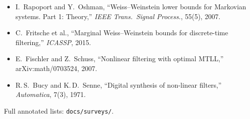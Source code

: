 \documentclass[11pt,a4paper]{article}
\begin{document}
\begin{itemize}
\item I.\ Rapoport and Y.\ Oshman, ``Weiss--Weinstein lower bounds for Markovian systems. Part 1: Theory,'' \emph{IEEE Trans.\ Signal Process.}, 55(5), 2007.
\item C.\ Fritsche et al., ``Marginal Weiss--Weinstein bounds for discrete-time filtering,'' \emph{ICASSP}, 2015.
\item E.\ Fischler and Z.\ Schuss, ``Nonlinear filtering with optimal MTLL,'' arXiv:math/0703524, 2007.
\item R.\,S.\ Bucy and K.\,D.\ Senne, ``Digital synthesis of non-linear filters,'' \emph{Automatica}, 7(3), 1971.
\end{itemize}
Full annotated lists: \texttt{docs/surveys/}.
\end{document}
